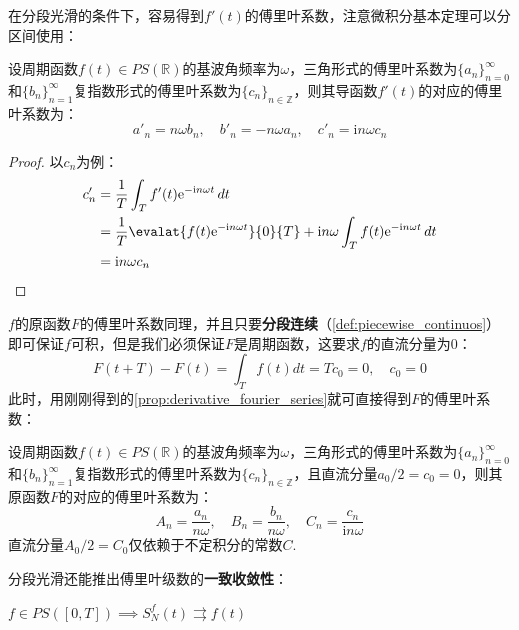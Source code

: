 在分段光滑的条件下，容易得到$f'(t)$的傅里叶系数，注意微积分基本定理可以分区间使用：
\begin{proposition}[导函数的傅里叶系数]
    \label{prop:derivative_fourier_series}
    设周期函数$f(t)\in PS(\mathbb{R} )$的基波角频率为$\omega$，三角形式的傅里叶系数为$\{a_n\}_{n=0}^\infty$和$\{b_n\}_{n=1}^\infty$复指数形式的傅里叶系数为$\{c_n\}_{n\in\mathbb{Z} }$，则其导函数$f'(t)$的对应的傅里叶系数为：
    \begin{equation*}
    a'_n=n\omega b_n,\quad b'_n=-n\omega a_n,\quad c'_n=\mathrm{i}n\omega c_n
\end{equation*}
\end{proposition}
\begin{proof}
    以$c_n$为例：
\begin{align*}
    c'_n & =\frac{1}{T}\int_{T}f'(t)\mathrm{e}^{-\mathrm{i}n\omega t}\,dt\\
    & =\frac{1}{T}\evalat{f(t)\mathrm{e}^{-\mathrm{i}n\omega t}}{0}{T}+\mathrm{i}n\omega\int_{T}f(t)\mathrm{e}^{-\mathrm{i}n\omega t}\,dt\\
    &=\mathrm{i}n\omega c_n
\end{align*}
\end{proof}

$f$的原函数$F$的傅里叶系数同理，并且只要\textbf{分段连续}（\cref{def:piecewise_continuos}）即可保证$f$可积，但是我们必须保证$F$是周期函数，这要求$f$的直流分量为0：
\[F(t+T)-F(t)=\int_{T}f(t)dt=Tc_0=0,\quad c_0=0\]
此时，用刚刚得到的\cref{prop:derivative_fourier_series}就可直接得到$F$的傅里叶系数：
\begin{proposition}[原函数的傅里叶系数]
    \label{prop:integral_fourier_series}
    设周期函数$f(t)\in PS(\mathbb{R} )$的基波角频率为$\omega$，三角形式的傅里叶系数为$\{a_n\}_{n=0}^\infty$和$\{b_n\}_{n=1}^\infty$复指数形式的傅里叶系数为$\{c_n\}_{n\in\mathbb{Z} }$，且直流分量$a_0/2=c_0=0$，则其原函数$F$的对应的傅里叶系数为：
    \begin{equation*}
        A_n=\frac{a_n}{n\omega},\quad B_n=\frac{b_n}{n\omega},\quad C_n=\frac{c_n}{\mathrm{i}n\omega}
    \end{equation*}
    直流分量$A_0/2=C_0$仅依赖于不定积分的常数$C$.
\end{proposition}

分段光滑还能推出傅里叶级数的\textbf{一致收敛性}：
\begin{theorem}\label{thm:uniform_convergency}
$f\in PS([0,T])\implies S_N^f(t)\rightrightarrows f(t)$
\end{theorem}

